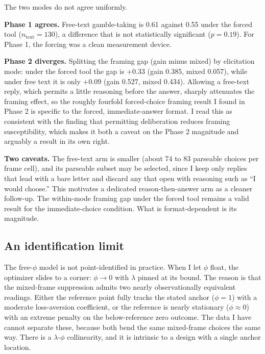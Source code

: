 \documentclass[11pt]{article}
\begin{document}
\begin{notebox}
The two modes do not agree uniformly.

\smallskip
\textbf{Phase 1 agrees.} Free-text gamble-taking is 0.61 against 0.55 under the forced tool
($n_{\text{text}} = 130$), a difference that is not statistically significant ($p = 0.19$). For Phase 1,
the forcing was a clean measurement device.

\smallskip
\textbf{Phase 2 diverges.} Splitting the framing gap (gain minus
mixed) by elicitation mode: under the forced tool the gap is $+0.33$ (gain 0.385, mixed 0.057), while
under free text it is only $+0.09$ (gain 0.527, mixed 0.434). Allowing a free-text reply, which permits a
little reasoning before the answer, sharply attenuates the framing effect, so the roughly fourfold
forced-choice framing result I found in Phase 2 is specific to the forced, immediate-answer format. I read
this as consistent with the finding that permitting deliberation reduces framing susceptibility, which
makes it both a caveat on the Phase 2 magnitude and arguably a result in its own right.

\smallskip
\textbf{Two caveats.} The free-text arm is smaller (about 74 to 83 parseable
choices per frame cell), and its parseable subset may be selected, since I keep only replies that lead
with a bare letter and discard any that open with reasoning such as ``I would choose.'' This motivates a
dedicated reason-then-answer arm as a cleaner follow-up. The within-mode framing gap under the forced tool
remains a valid result for the immediate-choice condition. What is format-dependent is its magnitude.
\end{notebox}

\subsection{An identification limit}

The free-$\phi$ model is not point-identified in
practice. When I let $\phi$ float, the optimizer slides to a corner: $\phi \rightarrow 0$ with $\lambda$
pinned at its bound. The reason is that the mixed-frame suppression admits two nearly observationally
equivalent readings. Either the reference point fully tracks the stated anchor ($\phi = 1$) with a
moderate loss-aversion coefficient, or the reference is nearly stationary ($\phi \approx 0$) with an
extreme penalty on the below-reference zero outcome. The data I have cannot separate these, because both
bend the same mixed-frame choices the same way. There is a $\lambda$-$\phi$ collinearity, and it is
intrinsic to a design with a single anchor location.
\end{document}
